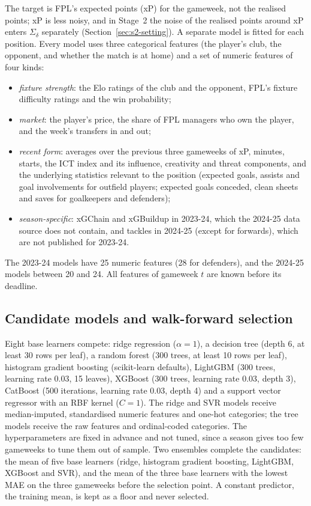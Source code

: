 \documentclass[12pt,oneside,a4paper]{book}
\theoremstyle{definition}
\theoremstyle{remark}
\begin{document}
	The target is FPL's expected points (xP) for the gameweek, not the realised points; xP is less
	noisy, and in Stage~2 the noise of the realised points around xP enters $\Sigma_\delta$
	separately (Section~\ref{sec:s2-setting}). A separate model is fitted for each position. Every model uses
	three categorical features (the player's club, the opponent, and whether the match is at home)
	and a set of numeric features of four kinds:
	\begin{itemize}
		\item \emph{fixture strength}: the Elo ratings of the club and the opponent, FPL's fixture
		difficulty ratings and the win probability;
		\item \emph{market}: the player's price, the share of FPL managers who own the player,
		and the week's transfers in and out;
		\item \emph{recent form}: averages over the previous three gameweeks of xP, minutes, starts,
		the ICT index and its influence, creativity and threat components, and the underlying
		statistics relevant to the position (expected goals, assists and goal involvements for
		outfield players; expected goals conceded, clean sheets and saves for goalkeepers and
		defenders);
		\item \emph{season-specific}: xGChain and xGBuildup in 2023-24, which the 2024-25 data source
		does not contain, and tackles in 2024-25 (except for forwards), which are not published for
		2023-24.
	\end{itemize}
	The 2023-24 models have 25 numeric features (28 for defenders), and the 2024-25 models between
	20 and 24. All features of gameweek $t$ are known before its deadline.

	\subsection{Candidate models and walk-forward selection}
	\label{sec:predictions-selection}

	Eight base learners compete: ridge regression ($\alpha=1$), a decision tree (depth 6, at least
	30 rows per leaf), a random forest (300 trees, at least 10 rows per leaf), histogram gradient
	boosting (scikit-learn defaults), LightGBM (300 trees, learning rate 0.03, 15 leaves), XGBoost
	(300 trees, learning rate 0.03, depth 3), CatBoost (500 iterations, learning rate 0.03, depth 4)
	and a support vector regressor with an RBF kernel ($C=1$). The ridge and SVR models receive
	median-imputed, standardised numeric features and one-hot categories; the tree models receive
	the raw features and ordinal-coded categories. The hyperparameters are fixed in advance and
	not tuned, since a season gives too few gameweeks to tune them out of sample. Two ensembles
	complete the candidates: the mean of five base learners (ridge, histogram gradient boosting,
	LightGBM, XGBoost and SVR), and the mean of the three base learners with the lowest MAE on the
	three gameweeks before the selection point. A constant predictor, the training mean, is kept as
	a floor and never selected.
\end{document}
